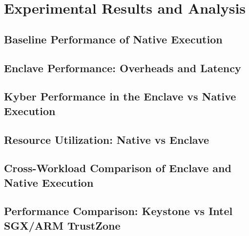 \chapter{Experimental Results and Analysis}
\label{chap:results}

\section{Baseline Performance of Native Execution}

\section{Enclave Performance: Overheads and Latency}

\section{Kyber Performance in the Enclave vs Native Execution}

\section{Resource Utilization: Native vs Enclave}

\section{Cross-Workload Comparison of Enclave and Native Execution}

\section{Performance Comparison: Keystone vs Intel SGX/ARM TrustZone}